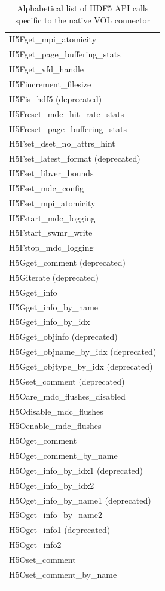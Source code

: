 \begin{longtable}{ |>{\raggedright\arraybackslash}p{\linewidth}| }
    H5Fget\_mpi\_atomicity \\
    H5Fget\_page\_buffering\_stats \\
    H5Fget\_vfd\_handle \\
    H5Fincrement\_filesize \\
    H5Fis\_hdf5 (deprecated) \\
    H5Freset\_mdc\_hit\_rate\_stats \\
    H5Freset\_page\_buffering\_stats \\
    H5Fset\_dset\_no\_attrs\_hint \\
    H5Fset\_latest\_format (deprecated) \\
    H5Fset\_libver\_bounds \\
    H5Fset\_mdc\_config \\
    H5Fset\_mpi\_atomicity \\
    H5Fstart\_mdc\_logging \\
    H5Fstart\_swmr\_write \\
    H5Fstop\_mdc\_logging \\
    \hline
    H5Gget\_comment (deprecated) \\
    H5Giterate (deprecated) \\
    H5Gget\_info \\
    H5Gget\_info\_by\_name \\
    H5Gget\_info\_by\_idx \\
    H5Gget\_objinfo (deprecated) \\
    H5Gget\_objname\_by\_idx (deprecated) \\
    H5Gget\_objtype\_by\_idx (deprecated) \\
    H5Gset\_comment (deprecated) \\
    \hline
    H5Oare\_mdc\_flushes\_disabled \\
    H5Odisable\_mdc\_flushes \\
    H5Oenable\_mdc\_flushes \\
    H5Oget\_comment \\
    H5Oget\_comment\_by\_name \\
    H5Oget\_info\_by\_idx1 (deprecated) \\
    H5Oget\_info\_by\_idx2 \\
    H5Oget\_info\_by\_name1 (deprecated) \\
    H5Oget\_info\_by\_name2 \\
    H5Oget\_info1 (deprecated) \\
    H5Oget\_info2 \\
    H5Oset\_comment \\
    H5Oset\_comment\_by\_name \\
    \hline
\caption{Alphabetical list of HDF5 API calls specific to the native VOL connector}
\end{longtable}

